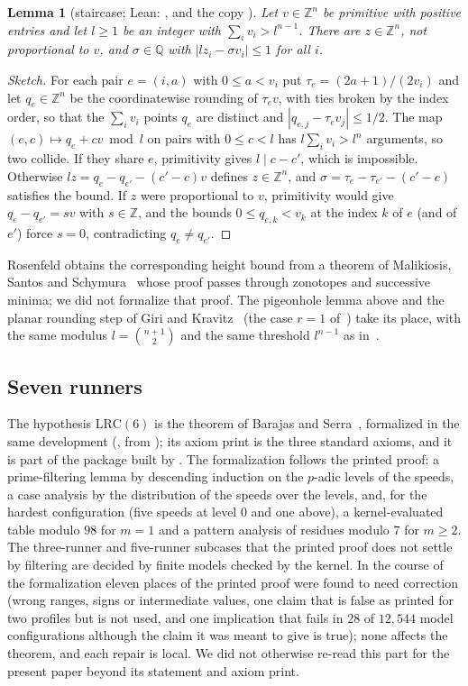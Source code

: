 \documentclass[11pt]{article}
\newtheorem{lemma}[theorem]{Lemma}
\theoremstyle{remark}
\newcommand{\Z}{\mathbb{Z}}
\newcommand{\Q}{\mathbb{Q}}
\begin{document}
\begin{lemma}[staircase; Lean: , and the copy ]\label{lem:stair}
Let $v\in\Z^n$ be primitive with positive entries and let $l\ge1$ be an integer with $\sum_iv_i>l^{n-1}$. There are $z\in\Z^n$, not proportional to $v$, and $\sigma\in\Q$ with $|lz_i-\sigma v_i|\le1$ for all $i$.
\end{lemma}
\begin{proof}[Sketch]
For each pair $e=(i,a)$ with $0\le a<v_i$ put $\tau_e=(2a+1)/(2v_i)$ and let $q_e\in\Z^n$ be the coordinatewise rounding of $\tau_ev$, with ties broken by the index order, so that the $\sum_iv_i$ points $q_e$ are distinct and $|q_{e,j}-\tau_ev_j|\le1/2$. The map $(e,c)\mapsto q_e+cv\bmod l$ on pairs with $0\le c<l$ has $l\sum_iv_i>l^n$ arguments, so two collide. If they share $e$, primitivity gives $l\mid c-c'$, which is impossible. Otherwise $lz=q_e-q_{e'}-(c'-c)v$ defines $z\in\Z^n$, and $\sigma=\tau_e-\tau_{e'}-(c'-c)$ satisfies the bound. If $z$ were proportional to $v$, primitivity would give $q_e-q_{e'}=sv$ with $s\in\Z$, and the bounds $0\le q_{e,k}<v_k$ at the index $k$ of $e$ (and of $e'$) force $s=0$, contradicting $q_e\ne q_{e'}$.
\end{proof}
Rosenfeld obtains the corresponding height bound from a theorem of Malikiosis, Santos and Schymura~\cite{MSS} whose proof passes through zonotopes and successive minima; we did not formalize that proof. The pigeonhole lemma above and the planar rounding step of Giri and Kravitz~\cite{GK} (the case $r=1$ of~\cite[Proposition~3.4]{All}) take its place, with the same modulus $l=\binom{n+1}{2}$ and the same threshold $l^{n-1}$ as in~\cite{Ros8}.

\subsection{Seven runners}\label{sec:bs}

The hypothesis $\mathrm{LRC}(6)$ is the theorem of Barajas and Serra~\cite{BS}, formalized in the same development (, from ); its axiom print is the three standard axioms, and it is part of the package built by . The formalization follows the printed proof: a prime-filtering lemma by descending induction on the $p$-adic levels of the speeds, a case analysis by the distribution of the speeds over the levels, and, for the hardest configuration (five speeds at level $0$ and one above), a kernel-evaluated table modulo $98$ for $m=1$ and a pattern analysis of residues modulo $7$ for $m\ge2$. The three-runner and five-runner subcases that the printed proof does not settle by filtering are decided by finite models checked by the kernel. In the course of the formalization eleven places of the printed proof were found to need correction (wrong ranges, signs or intermediate values, one claim that is false as printed for two profiles but is not used, and one implication that fails in $28$ of $12{,}544$ model configurations although the claim it was meant to give is true); none affects the theorem, and each repair is local. We did not otherwise re-read this part for the present paper beyond its statement and axiom print.
\end{document}
